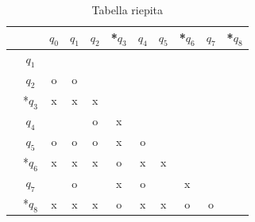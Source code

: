 \begin{enumerate}
      \begin{table}[ht]
          \centering
          \begin{tabular}{c c| c | c | c | c | c | c | c | c | c}
              && $q_0$ & $q_1$ & $q_2$ & *$q_3$ & $q_4$ & $q_5$ & *$q_6$ & $q_7$ & *$q_8$ \\
              \hline
              & $q_1$ & \\
              \hline
              & $q_2$ &o&o\\
              \hline
              & *$q_3$ &x&x&x\\
              \hline
              & $q_4$ & & &o&x\\
              \hline
              & $q_5$ &o&o&o&x&o\\
              \hline
              & *$q_6$ &x&x&x&o&x&x\\
              \hline
              & $q_7$ & &o& &x&o& &x\\
              \hline
              & *$q_8$ &x&x&x&o&x&x&o&o\\
          \end{tabular}
          \caption{Tabella riepita}
      \end{table}
\end{enumerate}
